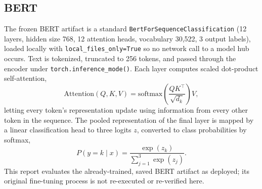\documentclass[12pt,a4paper]{article}
\begin{document}
\subsection{BERT}

The frozen BERT artifact is a standard \texttt{BertForSequenceClassification} (12 layers, hidden size 768, 12 attention heads, vocabulary 30{,}522, 3 output labels), loaded locally with \texttt{local\_files\_only=True} so no network call to a model hub occurs. Text is tokenized, truncated to 256 tokens, and passed through the encoder under \texttt{torch.inference\_mode()}. Each layer computes scaled dot-product self-attention,
\begin{equation}
\mathrm{Attention}(Q,K,V) = \mathrm{softmax}\!\left(\frac{QK^\top}{\sqrt{d_k}}\right)V,
\end{equation}
letting every token's representation update using information from every other token in the sequence. The pooled representation of the final layer is mapped by a linear classification head to three logits $z$, converted to class probabilities by softmax,
\begin{equation}
P(y=k\mid x) = \frac{\exp(z_k)}{\sum_{j=1}^{3}\exp(z_j)}.
\end{equation}
This report evaluates the already-trained, saved BERT artifact as deployed; its original fine-tuning process is not re-executed or re-verified here.
\end{document}
